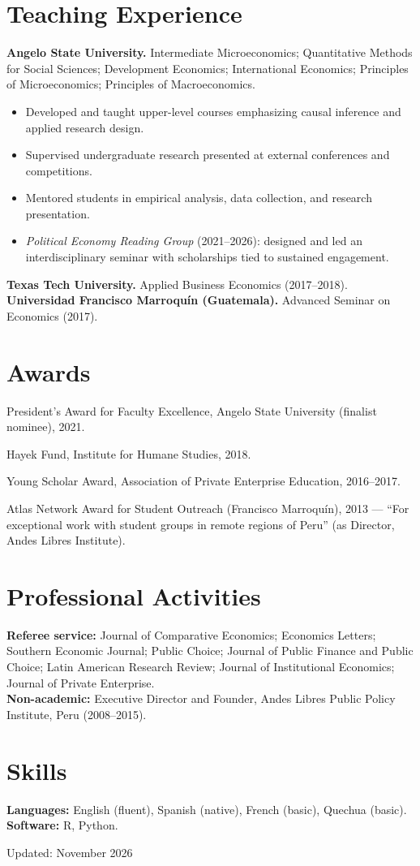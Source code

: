 \documentclass[11pt,letterpaper]{article}
\newenvironment{entries}
  {\begin{list}{}{\setlength{\leftmargin}{1.2em}\setlength{\itemindent}{-1.2em}\setlength{\itemsep}{5pt}\setlength{\topsep}{2pt}}}
  {\end{list}}
\begin{document}
\section{Teaching Experience}
\textbf{Angelo State University.} Intermediate Microeconomics; Quantitative Methods for Social Sciences; Development Economics; International Economics; Principles of Microeconomics; Principles of Macroeconomics.
\begin{itemize}
\item Developed and taught upper-level courses emphasizing causal inference and applied research design.
\item Supervised undergraduate research presented at external conferences and competitions.
\item Mentored students in empirical analysis, data collection, and research presentation.
\item \textit{Political Economy Reading Group} (2021--2026): designed and led an interdisciplinary seminar with scholarships tied to sustained engagement.
\end{itemize}
\textbf{Texas Tech University.} Applied Business Economics (2017--2018). \\
\textbf{Universidad Francisco Marroquín (Guatemala).} Advanced Seminar on Economics (2017).

\section{Awards}
\begin{entries}
\item[] President's Award for Faculty Excellence, Angelo State University (finalist nominee), 2021.
\item[] Hayek Fund, Institute for Humane Studies, 2018.
\item[] Young Scholar Award, Association of Private Enterprise Education, 2016--2017.
\item[] Atlas Network Award for Student Outreach (Francisco Marroquín), 2013 --- ``For exceptional work with student groups in remote regions of Peru'' (as Director, Andes Libres Institute).
\end{entries}

\section{Professional Activities}
\textbf{Referee service:} Journal of Comparative Economics; Economics Letters; Southern Economic Journal; Public Choice; Journal of Public Finance and Public Choice; Latin American Research Review; Journal of Institutional Economics; Journal of Private Enterprise.\\[4pt]
\textbf{Non-academic:} Executive Director and Founder, Andes Libres Public Policy Institute, Peru (2008--2015).

\section{Skills}
\textbf{Languages:} English (fluent), Spanish (native), French (basic), Quechua (basic).\\
\textbf{Software:} R, Python.

\vfill
{\footnotesize\color{gray}Updated: November 2026}
\end{document}
